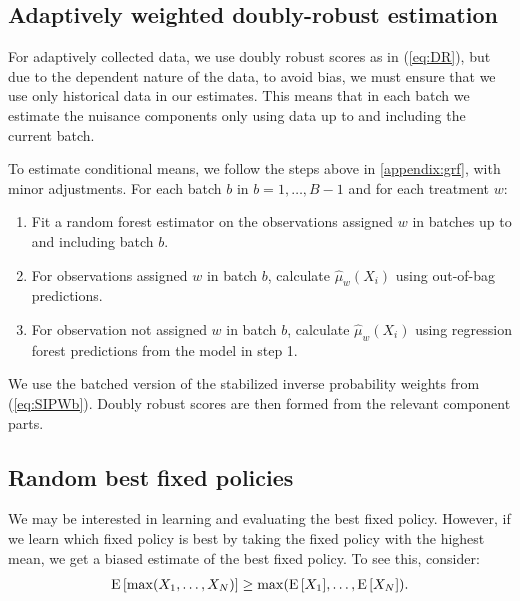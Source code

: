 \documentclass[letterpaper, 12pt, parskip=full,]{scrartcl}
\begin{document}
\subsection{Adaptively weighted doubly-robust estimation} %
\label{appendix:DRlfo}
For adaptively collected data, we use doubly robust scores as in (\ref{eq:DR}), but due to the dependent nature of the data, to avoid bias, we must ensure that we use only historical data in our estimates. This means that in each batch we estimate the nuisance components only using data up to and including the current batch. 

To estimate conditional means, we follow the steps above in \ref{appendix:grf}, with minor adjustments. For each batch $b$ in $b = 1, \dots, B-1$ and for each treatment $w$:
\begin{enumerate}
\item Fit a random forest estimator on the observations assigned $w$ in batches up to and including batch $b$. 
\item For observations assigned $w$ in batch $b$, calculate $\hat\mu_w(X_i)$ using out-of-bag predictions. 
\item For observation not assigned $w$ in batch $b$, calculate $\hat\mu_w(X_i)$ using regression forest predictions from the model in step 1. 
\end{enumerate}

We use the batched version of the stabilized inverse probability weights from (\ref{eq:SIPWb}). 
Doubly robust scores are then formed from the relevant component parts. 


\subsection{Random best fixed policies}\label{appendix:bestfixed}
We may be interested in learning and evaluating the best fixed policy. However, if we learn which fixed policy is best by taking the fixed policy with the highest mean, we get a biased estimate of the best fixed policy. To see this, consider:
\begin{align*}
{\textrm E}\,[\max(X_1, \dots, X_N)] \ge \max({\textrm E}\,[X_1],\dots, {\textrm E}\,[X_N]). 
\end{align*}
\end{document}
